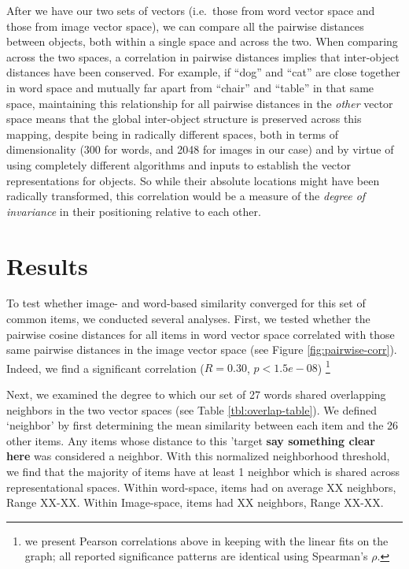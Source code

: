 \documentclass[10pt, letterpaper]{article}
\begin{document}
After we have our two sets of vectors (i.e.~those from word vector space
and those from image vector space), we can compare all the pairwise
distances between objects, both within a single space and across the
two. When comparing across the two spaces, a correlation in pairwise
distances implies that inter-object distances have been conserved. For
example, if ``dog'' and ``cat'' are close together in word space and
mutually far apart from ``chair'' and ``table'' in that same space,
maintaining this relationship for all pairwise distances in the
\textit{other} vector space means that the global inter-object structure
is preserved across this mapping, despite being in radically different
spaces, both in terms of dimensionality (300 for words, and 2048 for
images in our case) and by virtue of using completely different
algorithms and inputs to establish the vector representations for
objects. So while their absolute locations might have been radically
transformed, this correlation would be a measure of the
\textit{degree of invariance} in their positioning relative to each
other.

\section{Results}\label{results}

To test whether image- and word-based similarity converged for this set
of common items, we conducted several analyses. First, we tested whether
the pairwise cosine distances for all items in word vector space
correlated with those same pairwise distances in the image vector space
(see Figure \ref{fig:pairwise-corr}). Indeed, we find a significant
correlation (\(R = 0.30\), \(p < 1.5e-08\))
\footnote{we present Pearson correlations above in keeping with the linear fits on the graph; all reported significance patterns are identical using Spearman's $\rho$.}

Next, we examined the degree to which our set of 27 words shared
overlapping neighbors in the two vector spaces (see Table
\ref{tbl:overlap-table}). We defined `neighbor' by first determining the
mean similarity between each item and the 26 other items. Any items
whose distance to this 'target \textbf{say something clear here} was
considered a neighbor. With this normalized neighborhood threshold, we
find that the majority of items have at least 1 neighbor which is shared
across representational spaces. Within word-space, items had on average
XX neighbors, Range XX-XX. Within Image-space, items had XX neighbors,
Range XX-XX.
\end{document}
